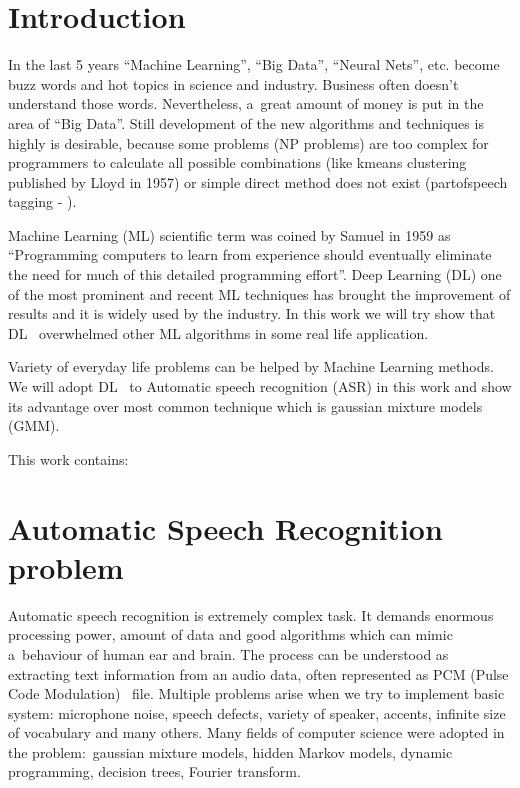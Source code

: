 \documentclass[a4paper]{report}
\theoremstyle{definition}
\begin{document}
\title{}
\author{Piotr Kowenzowski}
\date{\today}
\maketitle
\tableofcontents
\newpage

\listoftodos

\chapter{Introduction}


In the last 5 years ``Machine Learning'', ``Big Data'', ``Neural Nets'', etc. become buzz words and hot topics  in science and industry. Business often doesn't understand those words. Nevertheless, a~great amount of money is put in the area of ``Big Data''. Still development of the new algorithms and techniques is highly is desirable, because some problems (NP problems) are too complex for programmers to calculate all possible combinations (like k\dywiz means clustering published by Lloyd in 1957) or simple direct method does not exist (part\dywiz of\dywiz speech tagging - ).  

Machine Learning (ML) scientific term was coined by Samuel in 1959 as ``Programming computers to learn from experience should eventually eliminate the need for much of this detailed programming effort''. Deep Learning (DL) one of the most prominent and recent ML techniques has brought the improvement of results and it is widely used by the industry. In this work we will try show that DL~ overwhelmed other ML algorithms in some real life application.

Variety of everyday life problems can be helped by Machine Learning methods. We will adopt DL~ to Automatic speech recognition (ASR) in this work and show its advantage over most common technique which is gaussian mixture models (GMM).

This work contains:

\chapter{Automatic Speech Recognition problem}
Automatic speech recognition is extremely complex task. It demands enormous processing power, amount of data and good algorithms which can mimic a~behaviour of human ear and brain. The process can be understood as extracting text information from an audio data, often represented as PCM (Pulse Code Modulation) ~file. Multiple problems arise when we try to implement basic system: microphone noise, speech defects, variety of speaker, accents, infinite size of vocabulary and many others. Many fields of computer science were adopted in the problem:~gaussian mixture models, hidden Markov models, dynamic programming, decision trees, Fourier transform. 
\end{document}
